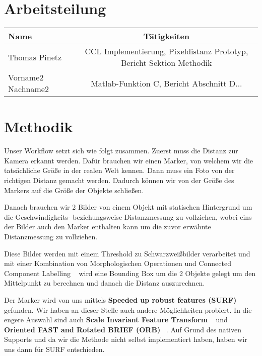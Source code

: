 \documentclass[deutsch]{scrartcl}
\begin{document}
\section{Arbeitsteilung}

\begin{center}
	\begin{tabular}{ |l | c | }
		\hline
		Name & Tätigkeiten\\
		\hline
		Thomas Pinetz & CCL Implementierung, Pixeldistanz Prototyp, Bericht Sektion Methodik \\
		\hline
		Vorname2 Nachname2 & Matlab-Funktion C, Bericht Abschnitt D...\\
		\hline
	\end{tabular}
\end{center}


\section{Methodik}

Unser Workflow setzt sich wie folgt zusammen. Zuerst muss die Distanz zur Kamera erkannt werden. Dafür brauchen wir einen Marker, von welchem wir die tatsächliche Größe in der realen Welt kennen. Dann muss ein Foto von der richtigen Distanz gemacht werden. Dadurch können wir von der Größe des Markers auf die Größe der Objekte schließen. 

Danach brauchen wir 2 Bilder von einem Objekt mit statischen Hintergrund um die Geschwindigkeits- beziehungsweise Distanzmessung zu vollziehen, wobei eins der Bilder auch den Marker enthalten kann um die zuvor erwähnte Distanzmessung zu vollziehen.

Diese Bilder werden mit einem Threshold zu Schwarzweißbilder verarbeitet und mit einer Kombination von Morphologischen Operationen und Connected Component Labelling ~\cite{suzuki2003linear} wird eine Bounding Box um die 2 Objekte gelegt um den Mittelpunkt zu berechnen und danach die Distanz auszurechnen.

Der Marker wird von uns mittels \textbf{Speeded up robust features (SURF)} ~\cite{bay2006surf} gefunden. Wir haben an dieser Stelle auch andere Möglichkeiten probiert. In die engere Auswahl sind auch \textbf{Scale Invariant Feature Transform} ~\cite{lowe2004distinctive} und \textbf{Oriented FAST and Rotated BRIEF (ORB)} ~\cite{rublee2011orb}. Auf Grund des nativen Supports und da wir die Methode nicht selbst implementiert haben, haben wir uns dann für SURF entschieden. 
\end{document}
